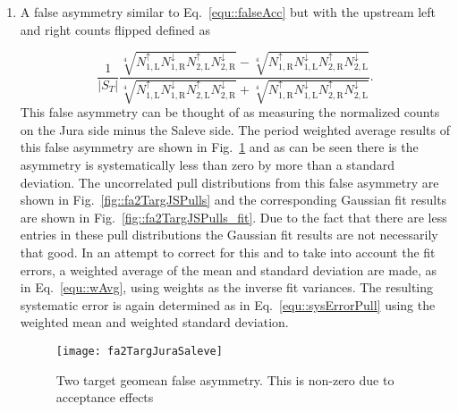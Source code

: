 \begin{enumerate}
  \label{tab::additionalFA}

\item A false asymmetry similar to Eq.~\ref{equ::falseAcc} but with the upstream
  left and right counts flipped defined as
  
  \begin{equation}
    \label{equ::additionalfalseAsym}
    \frac{1}{|S_T|}
    \frac{
      \sqrt[4]{
        N_{\mathrm{1,L}}^{\uparrow}N_{\mathrm{1,R}}^{\downarrow}
        N_{\mathrm{2,L}}^{\uparrow}N_{\mathrm{2,R}}^{\downarrow}
      } -
      \sqrt[4]{
        N_{\mathrm{1,R}}^{\uparrow}N_{\mathrm{1,L}}^{\downarrow}
        N_{\mathrm{2,R}}^{\uparrow}N_{\mathrm{2, L}}^{\downarrow}
      }
    }{
      \sqrt[4]{
        N_{\mathrm{1,L}}^{\uparrow}N_{\mathrm{1,R}}^{\downarrow}
        N_{\mathrm{2,L}}^{\uparrow}N_{\mathrm{2, R}}^{\downarrow}
      } +
      \sqrt[4]{
        N_{\mathrm{1,R}}^{\uparrow}N_{\mathrm{1,L}}^{\downarrow}
        N_{\mathrm{2,R}}^{\uparrow}N_{\mathrm{2, L}}^{\downarrow}
      }
    }.
  \end{equation}
  This false asymmetry can be thought of as measuring the normalized counts on
  the Jura side minus the Saleve side.  The period weighted average results of
  this false asymmetry are shown in Fig.~\ref{fig::fa2TargJuraSaleve} and as can
  be seen there is the asymmetry is systematically less than zero by more than a
  standard deviation.  The uncorrelated pull distributions from this false
  asymmetry are shown in Fig.~\ref{fig::fa2TargJSPulls} and the corresponding
  Gaussian fit results are shown in Fig.~\ref{fig::fa2TargJSPulls_fit}.  Due to
  the fact that there are less entries in these pull distributions the Gaussian
  fit results are not necessarily that good.  In an attempt to correct for this
  and to take into account the fit errors, a weighted average of the mean and
  standard deviation are made, as in Eq.~\ref{equ::wAvg}, using weights as the
  inverse fit variances.  The resulting systematic error is again determined as
  in Eq.~\ref{equ::sysErrorPull} using the weighted mean and weighted standard
  deviation.

  \begin{figure}[h!t]
    \centering
    \texttt{[image: fa2TargJuraSaleve]}
    \caption{Two target geomean false asymmetry.  This is non-zero due to
      acceptance effects}
    \label{fig::fa2TargJuraSaleve}
  \end{figure}
  

\end{enumerate}

